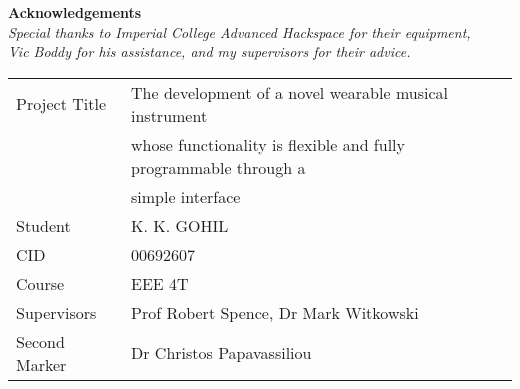 
\vfill

\begin{center}

\textbf{Acknowledgements}\\
\textit{Special thanks to Imperial College Advanced Hackspace for their equipment,\\Vic Boddy for his assistance, and my supervisors for their advice.}\\

\end{center}
\vspace{40 pt}

\large
\begin{tabular}{|l l}
Project Title & The development of a novel wearable musical instrument \\
& whose functionality is flexible and fully programmable through a \\ & simple interface \\
Student & K. K. GOHIL \\
CID & 00692607 \\
Course & EEE 4T \\
Supervisors & Prof Robert Spence, Dr Mark Witkowski \\
Second Marker & Dr Christos Papavassiliou 
\end{tabular}
\normalsize
\newpage